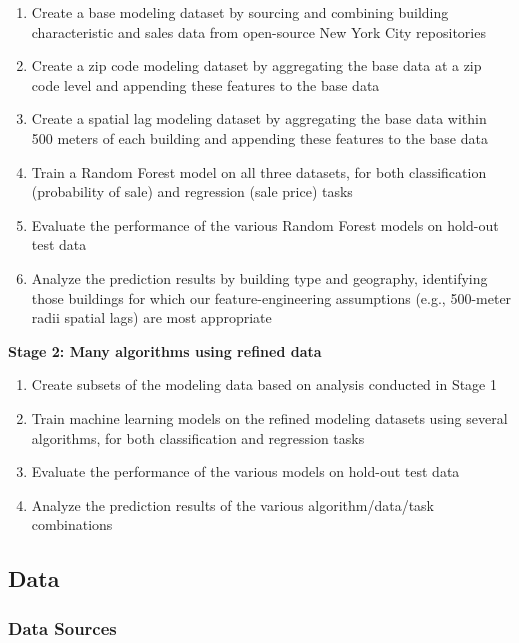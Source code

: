 \documentclass[12pt,]{article}
\providecommand{\tightlist}{%
  \setlength{\itemsep}{0pt}\setlength{\parskip}{0pt}}
\begin{document}
\begin{enumerate}
\def\labelenumi{\arabic{enumi})}
\tightlist
\item
  Create a base modeling dataset by sourcing and combining building
  characteristic and sales data from open-source New York City
  repositories
\item
  Create a zip code modeling dataset by aggregating the base data at a
  zip code level and appending these features to the base data
\item
  Create a spatial lag modeling dataset by aggregating the base data
  within 500 meters of each building and appending these features to the
  base data
\item
  Train a Random Forest model on all three datasets, for both
  classification (probability of sale) and regression (sale price) tasks
\item
  Evaluate the performance of the various Random Forest models on
  hold-out test data
\item
  Analyze the prediction results by building type and geography,
  identifying those buildings for which our feature-engineering
  assumptions (e.g., 500-meter radii spatial lags) are most
  appropriate\newline
\end{enumerate}

\noindent \textbf{Stage 2: Many algorithms using refined data}

\begin{enumerate}
\def\labelenumi{\arabic{enumi})}
\setcounter{enumi}{6}
\tightlist
\item
  Create subsets of the modeling data based on analysis conducted in
  Stage 1
\item
  Train machine learning models on the refined modeling datasets using
  several algorithms, for both classification and regression tasks
\item
  Evaluate the performance of the various models on hold-out test data
\item
  Analyze the prediction results of the various algorithm/data/task
  combinations
\end{enumerate}

\hypertarget{data}{%
\subsection{Data}\label{data}}

\hypertarget{data-sources}{%
\subsubsection{Data Sources}\label{data-sources}}
\end{document}
